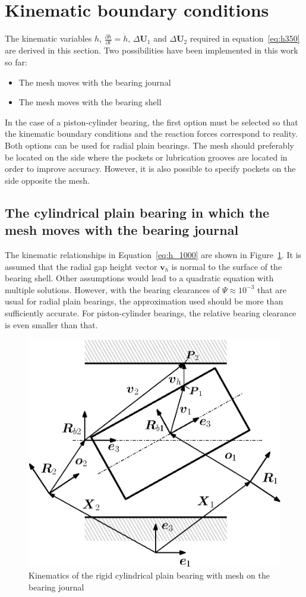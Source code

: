 \section{Kinematic boundary conditions}
\label{sec:h100}
The kinematic variables $h$, $\frac{\partial h}{\partial t}=\dot{h}$, $\Delta \boldsymbol{U}_1$ and $\Delta \boldsymbol{U}_2$ required in equation~\ref{eq:h350} are derived in this section. Two possibilities have been implemented in this work so far:
\begin{itemize}
  \item The mesh moves with the bearing journal
  \item The mesh moves with the bearing shell
\end{itemize}
In the case of a piston-cylinder bearing, the first option must be selected so that the kinematic boundary conditions and the reaction forces correspond to reality. Both options can be used for radial plain bearings. The mesh should preferably be located on the side where the pockets or lubrication grooves are located in order to improve accuracy. However, it is also possible to specify pockets on the side opposite the mesh.

\subsection{The cylindrical plain bearing in which the mesh moves with the bearing journal}
\label{sec:h200}
The kinematic relationships in Equation~\ref{eq:h_1000} are shown in Figure~\ref{fig:h400}. It is assumed that the radial gap height vector $\boldsymbol{v}_h$ is normal to the surface of the bearing shell. Other assumptions would lead to a quadratic equation with multiple solutions. However, with the bearing clearances of $\Psi \approx 10^{-3}$ that are usual for radial plain bearings, the approximation used should be more than sufficiently accurate. For piston-cylinder bearings, the relative bearing clearance is even smaller than that.

\begin{figure}[htb]
\centering
\includegraphics[width=0.5\linewidth]{fig_h400}
\caption{Kinematics of the rigid cylindrical plain bearing with mesh on the bearing journal}
\label{fig:h400}
\end{figure}

